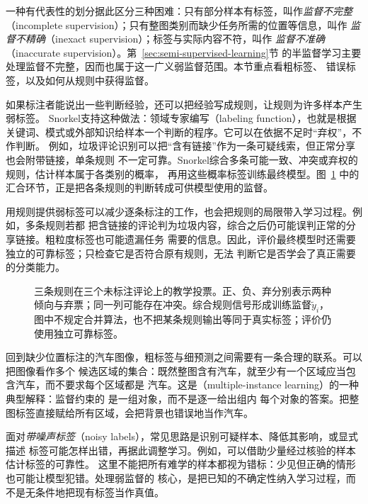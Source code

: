 一种有代表性的划分据此区分三种困难：只有部分样本有标签，叫作\emph{监督不完整}
（incomplete supervision）；只有整图类别而缺少任务所需的位置等信息，叫作
\emph{监督不精确}（inexact supervision）；标签与实际内容不符，叫作
\emph{监督不准确}（inaccurate supervision）。第~\ref{sec:semi-supervised-learning}节
的半监督学习主要处理监督不完整，因而也属于这一广义弱监督范围。本节重点看粗标签、
错误标签，以及如何从规则中获得监督。

如果标注者能说出一些判断经验，还可以把经验写成规则，让规则为许多样本产生弱标签。
Snorkel支持这种做法：领域专家编写（labeling function），也就是根据
关键词、模式或外部知识给样本一个判断的程序。它可以在依据不足时“弃权”，不作判断。
例如，垃圾评论识别可以把“含有链接”作为一条可疑线索，但正常分享也会附带链接，单条规则
不一定可靠。Snorkel综合多条可能一致、冲突或弃权的规则，估计样本属于各类别的概率，
再用这些概率标签训练最终模型。图~\ref{fig:weak-supervision-process}
中的汇合环节，正是把各条规则的判断转成可供模型使用的监督。

用规则提供弱标签可以减少逐条标注的工作，也会把规则的局限带入学习过程。例如，多条规则若都
把含链接的评论判为垃圾内容，综合之后仍可能误判正常的分享链接。粗粒度标签也可能遗漏任务
需要的信息。因此，评价最终模型时还需要独立的可靠标签；只检查它是否符合原有规则，无法
判断它是否学会了真正需要的分类能力。

\begin{figure}[htbp]
  \centering
  
  \caption{三条规则在三个未标注评论上的教学投票。正、负、弃分别表示两种倾向与弃票；同一列可能存在冲突。综合规则信号形成训练监督$\tilde y_i$，图中不规定合并算法，也不把某条规则输出等同于真实标签；评价仍使用独立可靠标签。}
  \label{fig:weak-supervision-process}
\end{figure}
\FloatBarrier

回到缺少位置标注的汽车图像，粗标签与细预测之间需要有一条合理的联系。可以把图像看作多个
候选区域的集合：既然整图含有汽车，就至少有一个区域应当包含汽车，而不要求每个区域都是
汽车。这是（multiple-instance learning）的一种典型解释：监督约束的
是一组对象，而不是逐一给出组内
每个对象的答案。把整图标签直接赋给所有区域，会把背景也错误地当作汽车。

面对\emph{带噪声标签}（noisy labels），常见思路是识别可疑样本、降低其影响，或显式描述
标签可能怎样出错，再据此调整学习。例如，可以借助少量经过核验的样本估计标签的可靠性。
这里不能把所有难学的样本都视为错标：少见但正确的情形也可能让模型犯错。处理弱监督的
核心，是把已知的不确定性纳入学习过程，而不是无条件地把现有标签当作真值。

